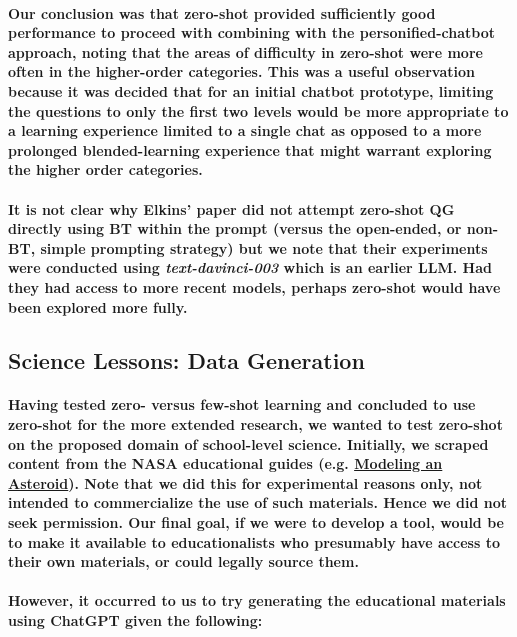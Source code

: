 \documentclass{article}
\begin{document}
\paragraph{Our conclusion was that zero-shot provided sufficiently good performance to proceed with combining with the personified-chatbot approach, noting that the areas of difficulty in zero-shot were more often in the higher-order categories. This was a useful observation because it was decided that for an initial chatbot prototype, limiting the questions to only the first two levels would be more appropriate to a learning experience limited to a single chat as opposed to a more prolonged blended-learning experience that might warrant exploring the higher order categories.}

\paragraph{It is not clear why Elkins’ paper did not attempt zero-shot QG directly using BT within the prompt (versus the open-ended, or non-BT, simple prompting strategy) but we note that their experiments were conducted using \textit{text-davinci-003} which is an earlier LLM. Had they had access to more recent models, perhaps zero-shot would have been explored more fully.}

\subsection*{Science Lessons: Data Generation}

\paragraph{Having tested zero- versus few-shot learning and concluded to use zero-shot for the more extended research, we wanted to test zero-shot on the proposed domain of school-level science. Initially, we scraped content from the NASA educational guides (e.g. \href{https://www.jpl.nasa.gov/edu/teach/activity/modeling-an-asteroid/}{Modeling an Asteroid}). Note that we did this for experimental reasons only, not intended to commercialize the use of such materials. Hence we did not seek permission. Our final goal, if we were to develop a tool, would be to make it available to educationalists who presumably have access to their own materials, or could legally source them.}

\paragraph{However, it occurred to us to try generating the educational materials using ChatGPT given the following:}
\end{document}
